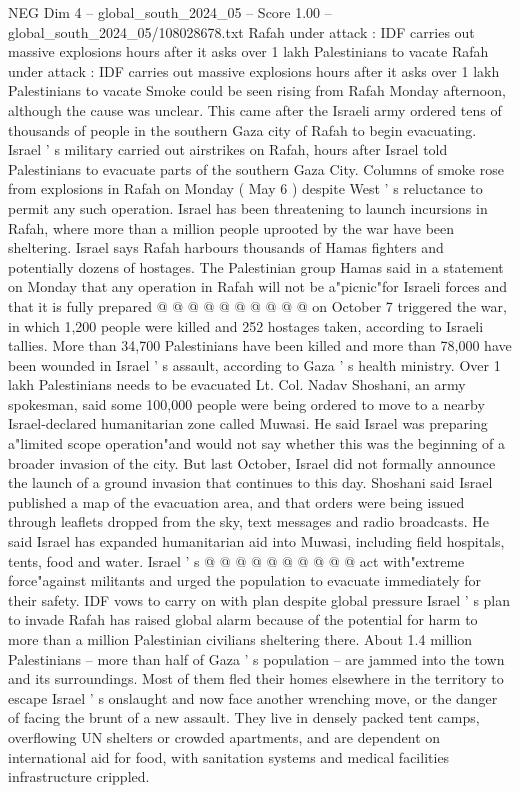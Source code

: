 \begin{textsample}{NEG Dim 4 – global\_south\_2024\_05 – Score 1.00 – global\_south\_2024\_05/108028678.txt}  \label{ex:f4_neg_253}
Rafah under attack : IDF carries out massive explosions hours after it asks over 1 lakh Palestinians to vacate Rafah under attack : IDF carries out massive explosions hours after it asks over 1 lakh Palestinians to vacate Smoke could be seen rising from Rafah Monday afternoon, although the cause was unclear.
This came after the Israeli army ordered tens of thousands of people in the southern Gaza city of Rafah to begin evacuating.
Israel ' s military carried out airstrikes on Rafah, hours after Israel told Palestinians to evacuate parts of the southern Gaza City.
Columns of smoke rose from explosions in Rafah on Monday ( May 6 ) despite West ' s reluctance to permit any such operation.
Israel has been threatening to launch incursions in Rafah, where more than a million people uprooted by the war have been sheltering.
Israel says Rafah harbours thousands of Hamas fighters and potentially dozens of hostages.
The Palestinian group Hamas said in a statement on Monday that any operation in Rafah will not be a"picnic"for Israeli forces and that it is fully prepared @ @ @ @ @ @ @ @ @ @ on October 7 triggered the war, in which 1,200 people were killed and 252 hostages taken, according to Israeli tallies.
More than 34,700 Palestinians have been killed and more than 78,000 have been wounded in Israel ' s assault, according to Gaza ' s health ministry.
Over 1 lakh Palestinians needs to be evacuated Lt.
Col.
Nadav Shoshani, an army spokesman, said some 100,000 people were being ordered to move to a nearby Israel-declared humanitarian zone called Muwasi.
He said Israel was preparing a"limited scope operation"and would not say whether this was the beginning of a broader invasion of the city.
But last October, Israel did not formally announce the launch of a ground invasion that continues to this day.
Shoshani said Israel published a map of the evacuation area, and that orders were being issued through leaflets dropped from the sky, text messages and radio broadcasts.
He said Israel has expanded humanitarian aid into Muwasi, including field hospitals, tents, food and water.
Israel ' s @ @ @ @ @ @ @ @ @ @ act with"extreme force"against militants and urged the population to evacuate immediately for their safety.
IDF vows to carry on with plan despite global pressure Israel ' s plan to invade Rafah has raised global alarm because of the potential for harm to more than a million Palestinian civilians sheltering there.
About 1.4 million Palestinians -- more than half of Gaza ' s population -- are jammed into the town and its surroundings.
Most of them fled their homes elsewhere in the territory to escape Israel ' s onslaught and now face another wrenching move, or the danger of facing the brunt of a new assault.
They live in densely packed tent camps, overflowing UN shelters or crowded apartments, and are dependent on international aid for food, with sanitation systems and medical facilities infrastructure crippled.

\end{textsample}
